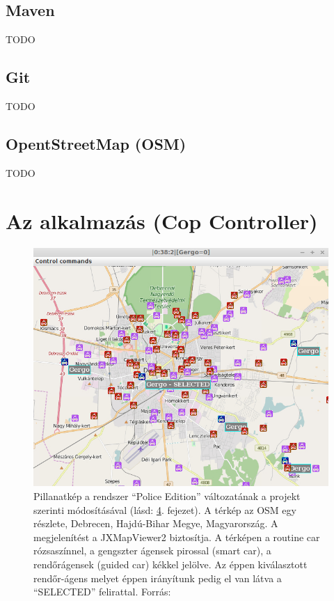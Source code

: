\documentclass[a4paper,12pt]{report}
\begin{document}
\newpage
\section{Maven}
\label{maven}

TODO

\newpage
\section{Git}
\label{git}

TODO


\newpage
\section{OpentStreetMap (OSM)}
\label{osm}

TODO

\newpage
\chapter{Az alkalmazás (Cop Controller)}
\label{theapp}

\begin{figure}[h]
\centerline{
\includegraphics[width=6in]{img/copselected}}
\caption{Pillanatkép a rendszer ``Police Edition'' változatának a projekt szerinti módosításával (lásd: \ref{theapp}. fejezet). A térkép az OSM egy részlete, Debrecen, Hajdú-Bihar Megye, Magyarország. A megjelenítést a JXMapViewer2 \cite{jxmapv} biztosítja. A térképen a routine car rózsaszínnel, a gengszter ágensek pirossal (smart car), a rendőrágensek (guided car) kékkel jelölve. Az éppen kiválasztott rendőr-ágens melyet éppen irányítunk pedig el van látva a ``SELECTED'' felirattal. Forrás: \cite{infocomjournal} 
\label{police}}
\end{figure}
\end{document}
